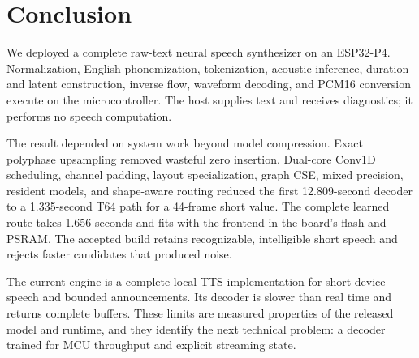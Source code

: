 \documentclass[10pt]{article}
\begin{document}
\section{Conclusion}

We deployed a complete raw-text neural speech synthesizer on an ESP32-P4.
Normalization, English phonemization, tokenization, acoustic inference,
duration and latent construction, inverse flow, waveform decoding, and PCM16
conversion execute on the microcontroller. The host supplies text and receives
diagnostics; it performs no speech computation.

The result depended on system work beyond model compression. Exact polyphase
upsampling removed wasteful zero insertion. Dual-core Conv1D scheduling,
channel padding, layout specialization, graph CSE, mixed precision, resident
models, and shape-aware routing reduced the first 12.809-second decoder to a
1.335-second T64 path for a 44-frame short value. The complete learned route
takes 1.656 seconds and fits with the frontend in the board's flash and PSRAM.
The accepted build retains recognizable, intelligible short speech and rejects
faster candidates that produced noise.

The current engine is a complete local TTS implementation for short device
speech and bounded announcements. Its decoder is slower than real time and
returns complete buffers. These limits are measured properties of the released
model and runtime, and they identify the next technical problem: a decoder
trained for MCU throughput and explicit streaming state.



\end{document}
